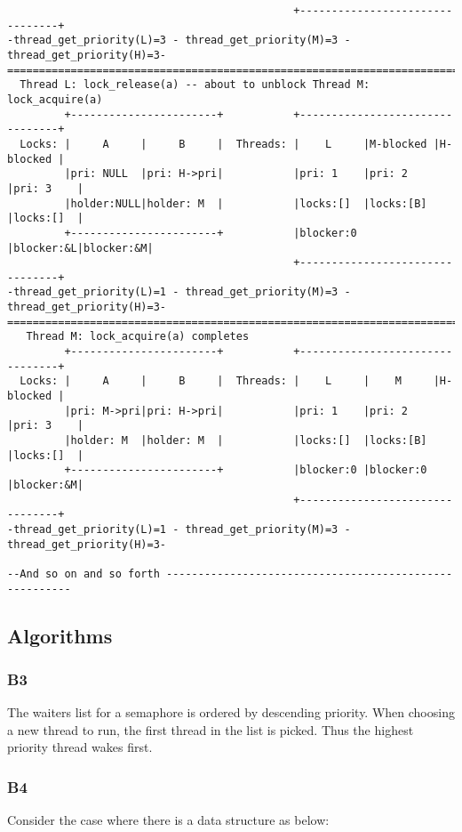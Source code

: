 \documentclass[a4wide, 11pt]{article}
\begin{document}
\begin{verbatim}
                                             +--------------------------------+
-thread_get_priority(L)=3 - thread_get_priority(M)=3 - thread_get_priority(H)=3-
================================================================================
  Thread L: lock_release(a) -- about to unblock Thread M: lock_acquire(a) 
         +-----------------------+           +--------------------------------+
  Locks: |     A     |     B     |  Threads: |    L     |M-blocked |H-blocked |
         |pri: NULL  |pri: H->pri|           |pri: 1    |pri: 2    |pri: 3    |
         |holder:NULL|holder: M  |           |locks:[]  |locks:[B] |locks:[]  |
         +-----------------------+           |blocker:0 |blocker:&L|blocker:&M|
                                             +--------------------------------+
-thread_get_priority(L)=1 - thread_get_priority(M)=3 - thread_get_priority(H)=3-
================================================================================
   Thread M: lock_acquire(a) completes
         +-----------------------+           +--------------------------------+
  Locks: |     A     |     B     |  Threads: |    L     |    M     |H-blocked |
         |pri: M->pri|pri: H->pri|           |pri: 1    |pri: 2    |pri: 3    |
         |holder: M  |holder: M  |           |locks:[]  |locks:[B] |locks:[]  |
         +-----------------------+           |blocker:0 |blocker:0 |blocker:&M|
                                             +--------------------------------+
-thread_get_priority(L)=1 - thread_get_priority(M)=3 - thread_get_priority(H)=3-

--And so on and so forth -------------------------------------------------------
\end{verbatim}

\subsection{Algorithms}
\subsubsection{B3}
The waiters list for a semaphore is ordered by descending priority. When choosing a new thread to run, the first thread in the list is picked. Thus the highest priority thread wakes first.
\subsubsection{B4}
Consider the case where there is a data structure as below:
\end{document}

